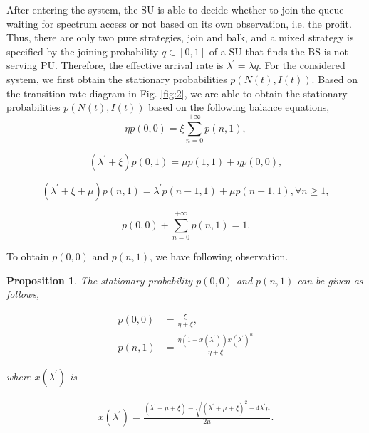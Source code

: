 \documentclass[journal]{IEEEtran}
\begin{document}
After entering the system, the SU is able to decide whether to
join the queue waiting for spectrum access or not based on its own
observation, i.e. the profit. Thus, there are only two pure
strategies, join and balk, and a mixed strategy is specified by
the joining probability $q \in [0,1]$ of a SU that finds the BS is
not serving PU. Therefore, the effective arrival rate is
$\lambda^{'} = \lambda q$. For the considered system, we first
obtain the stationary probabilities $p(N(t), I(t))$. Based on the
transition rate diagram in Fig. \ref{fig:2}, we are able to obtain
the stationary probabilities $p(N(t), I(t))$ based on the
following balance equations,
\begin{equation}
\label{eq:SP1} \eta p(0,0)  =  \xi \sum_{n=0}^{+ \infty} p(n,1),
\end{equation}

\begin{equation}
\label{eq:SP1.1} (\lambda^{'} + \xi) p(0,1) =  \mu p(1,1) + \eta p
(0,0),
\end{equation}

\begin{equation}
\label{eq:SP1.2}  (\lambda^{'} + \xi + \mu) p(n,1) =  \lambda^{'}
p(n-1,1) + \mu p (n+1,1), \forall n \geq 1,
\end{equation}


\begin{equation}
\label{eq:SP1.3} p(0,0) + \sum_{n=0}^{+ \infty} p(n,1) = 1.
\end{equation}

To obtain $p(0,0)$ and $p(n,1)$, we have following observation.

\newtheorem{proposition}{Proposition}
\begin{proposition}
The stationary probability $p(0,0)$ and $p(n,1)$ can be given as
follows,

\begin{equation}
\begin{split}
\label{eq:SP11}
p(0,0) & =  \frac{\xi}{\eta+\xi}, \\
p(n,1) & =  \frac{\eta(1-x(\lambda^{'} ))x(\lambda^{'}
)^n}{\eta+\xi}
\end{split}
\end{equation}

\noindent where $x(\lambda^{'} )$ is

\begin{equation}
\begin{split}
\label{eq:SP2}
x(\lambda^{'} ) =  \frac{(\lambda^{'} + \mu + \xi)- \sqrt{(\lambda^{'} + \mu + \xi)^2 - 4 \lambda^{'}  \mu}}{2\mu}. \\
\end{split}
\end{equation}
\end{proposition}
\end{document}
